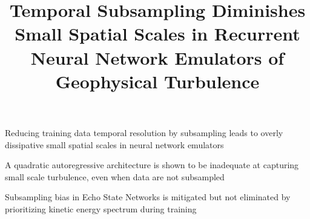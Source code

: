 \documentclass[draft]{agujournal2019}
\begin{document}
\title{Temporal Subsampling Diminishes Small Spatial Scales in
    Recurrent Neural Network Emulators of
    Geophysical Turbulence}

%
%




\begin{keypoints}
    \item Reducing training data temporal resolution by subsampling leads to
        overly dissipative small spatial scales in neural network
        emulators
    \item A quadratic autoregressive architecture is shown to be inadequate at capturing
        small scale turbulence, even when data are not subsampled
    \item Subsampling bias in Echo State Networks is mitigated but not
        eliminated by prioritizing kinetic energy spectrum during training
\end{keypoints}

%
%
\end{document}
